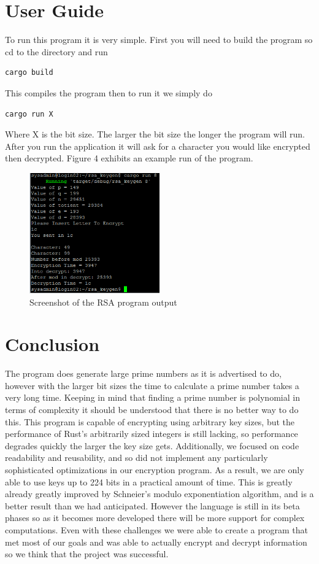 \documentclass[11pt,technote]{IEEEtran}
\begin{document}
\section{User Guide}
To run this program it is very simple. First you will need to build the program 
so cd to the directory and run 
\begin{lstlisting}[basicstyle=\small]
cargo build
\end{lstlisting} 
This compiles the program then to run it we simply do 
\begin{lstlisting}[basicstyle=\small]
cargo run X 
\end{lstlisting}
Where X is the bit size. The larger the bit size the longer the program will 
run. After you run the application it will ask for a character you would like 
encrypted then decrypted. Figure 4 exhibits an example run of the program.
\begin{figure}
	\begin{center}
		\includegraphics[width=0.5\textwidth]{Capture.PNG}
		\caption{Screenshot of the RSA program output}
	\end{center}
\end{figure}

\section{Conclusion}
The program does generate large prime numbers as it is advertised to do, however 
with the larger bit sizes the time to calculate a prime number takes a very long 
time. Keeping in mind that finding a prime number is polynomial in terms of 
complexity it should be understood that there is no better way to do this. This 
program is capable of encrypting using arbitrary key sizes, but the performance
of Rust's arbitrarily sized integers is still lacking, so performance degrades
quickly the larger the key size gets. Additionally, we focused on code
readability and reusability, and so did not implement any particularly
sophisticated optimizations in our encryption program. As a result, we are only
able to use keys up to 224 bits in a practical amount of time. This is greatly
already greatly improved by Schneier's modulo exponentiation algorithm, and is a
better result than we had anticipated. However the language is still in its beta 
phases so as it becomes more developed there will be more support for complex 
computations. Even with these challenges we were able to create a program that 
met most of our goals and was able to actually encrypt and decrypt information 
so we think that the project was successful.
\cite{sonsec}


\end{document}
